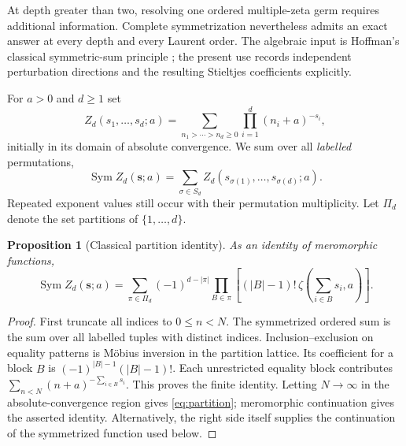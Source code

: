 \documentclass[11pt,letterpaper]{article}
\numberwithin{equation}{section}
\theoremstyle{plain}
\newtheorem{proposition}[theorem]{Proposition}
\theoremstyle{definition}
\theoremstyle{remark}
\DeclareMathOperator{\Sym}{Sym}
\begin{document}
At depth greater than two, resolving one ordered multiple-zeta germ
requires additional information. Complete symmetrization nevertheless
admits an exact answer at every depth and every Laurent order. The
algebraic input is Hoffman's classical symmetric-sum principle
\cite{hoffman}; the present use records independent perturbation
directions and the resulting Stieltjes coefficients explicitly.

For $a>0$ and $d\ge1$ set
\[
 Z_d(s_1,\ldots,s_d;a)
   =\sum_{n_1>\cdots>n_d\ge0}\prod_{i=1}^d(n_i+a)^{-s_i},
\]
initially in its domain of absolute convergence. We sum over all
\emph{labelled} permutations,
\[
 \Sym Z_d(\boldsymbol s;a)
   =\sum_{\sigma\in S_d}Z_d(s_{\sigma(1)},\ldots,s_{\sigma(d)};a).
\]
Repeated exponent values still occur with their permutation
multiplicity. Let $\Pi_d$ denote the set partitions of $\{1,\ldots,d\}$.

\begin{proposition}[Classical partition identity]\label{prop:partition}
As an identity of meromorphic functions,
\begin{equation}\label{eq:partition}
 \Sym Z_d(\boldsymbol s;a)
 =\sum_{\pi\in\Pi_d}(-1)^{d-|\pi|}
      \prod_{B\in\pi}\left[(|B|-1)!\,
                \zeta\left(\sum_{i\in B}s_i,a\right)\right].
\end{equation}
\end{proposition}
\begin{proof}
First truncate all indices to $0\le n<N$. The symmetrized ordered
sum is the sum over all labelled tuples with distinct indices.
Inclusion--exclusion on equality patterns is M\"obius inversion in the
partition lattice. Its coefficient for a block $B$ is
$(-1)^{|B|-1}(|B|-1)!$. Each unrestricted equality block contributes
$\sum_{n<N}(n+a)^{-\sum_{i\in B}s_i}$. This proves the finite identity.
Letting $N\to\infty$ in the absolute-convergence region gives
\eqref{eq:partition}; meromorphic continuation gives the asserted
identity. Alternatively, the right side itself supplies the
continuation of the symmetrized function used below.
\end{proof}
\end{document}
